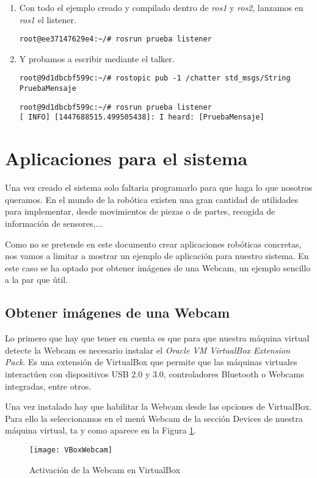 \begin{enumerate}
\begin{enumerate}
			\item Con todo el ejemplo creado y compilado dentro de \emph{ros1} y \emph{ros2}, lanzamos en \emph{ros1} el listener.
			\begin{lstlisting}[style=consola]
root@ee37147629e4:~/# rosrun prueba listener	
			\end{lstlisting}
			
			\item Y probamos a escribir mediante el talker.
			\begin{lstlisting}[style=consola]
root@9d1dbcbf599c:~/# rostopic pub -1 /chatter std_msgs/String PruebaMensaje
			\end{lstlisting}
			\begin{lstlisting}[style=consola]
root@9d1dbcbf599c:~/# rosrun prueba listener
[ INFO] [1447688515.499505438]: I heard: [PruebaMensaje]
			\end{lstlisting}

		\end{enumerate}
		
	\end{enumerate}
	
	\section{Aplicaciones para el sistema}
	Una vez creado el sistema solo faltaria programarlo para que haga lo que nosotros queramos. En el mundo de la robótica existen una gran cantidad de utilidades para implementar, desde movimientos de piezas o de partes, recogida de información de sensores,...
	
	Como no se pretende en este documento crear aplicaciones robóticas concretas, nos vamos a limitar a mostrar un ejemplo de aplicación para nuestro sistema. En este caso se ha optado por obtener imágenes de una Webcam, un ejemplo sencillo a la par que útil.
		
		\subsection{Obtener imágenes de una Webcam}
		Lo primero que hay que tener en cuenta es que para que nuestra máquina virtual detecte la Webcam es necesario instalar el \textit{Oracle VM VirtualBox Extension Pack}. Es una extensión de VirtualBox que permite que las máquinas virtuales interactúen con dispositivos USB 2.0 y 3.0, controladores Bluetooth o Webcams integradas, entre otros.
		
		Una vez instalado hay que habilitar la Webcam desde las opciones de VirtualBox. Para ello la seleccionamos en el menú Webcam de la sección Devices de nuestra máquina virtual, ta y como aparece en la Figura \ref{fig:VBoxWebcam}.
		\begin{figure}[H]
			\centering
			\texttt{[image: VBoxWebcam]}
			\caption{Activación de la Webcam en VirtualBox}
			\label{fig:VBoxWebcam}
		\end{figure}
		
